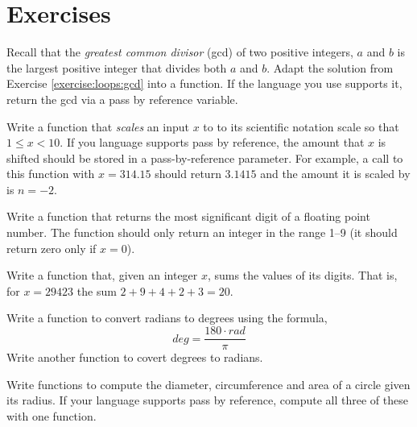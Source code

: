 

\section{Exercises}

\begin{exer}
\label{exercise:functions:gcd}
Recall that the \emph{greatest common divisor} (gcd) of two positive integers, 
$a$ and $b$ is the largest positive integer that divides both $a$ and
$b$.  Adapt the solution from Exercise \ref{exercise:loops:gcd} into
a function.  If the language you use supports it, return the gcd via
a pass by reference variable.
\end{exer}

\begin{exer}
Write a function that \emph{scales} an input $x$ to to its scientific
notation scale so that $1 \leq x < 10$.  If you language supports 
pass by reference, the amount that $x$ is shifted should be stored 
in a pass-by-reference parameter.  For example, a call to this function 
with $x = 314.15$ should return $3.1415$ and the amount it is scaled
by is $n=-2$.
\end{exer}

\begin{exer}
Write a function that returns the most significant digit of a floating
point number.  The function should only return an integer in the range 
1--9 (it should return zero only if $x = 0$).
\end{exer}

\begin{exer}
Write a function that, given an integer $x$, sums the values of
its digits.  That is, for $x = 29423$ the sum $2 + 9 + 4 + 2 + 3 = 20$.
\end{exer}

\begin{exer}
Write a function to convert radians to degrees using the formula,
  $$deg = \frac{180\cdot rad}{\pi}$$
Write another function to covert degrees to radians.
\end{exer}

\begin{exer}
\label{exercise:functions:circleStats}
Write functions to compute the diameter, circumference and
area of a circle given its radius.  If your language supports 
pass by reference, compute all three of these with one function.
\end{exer}

